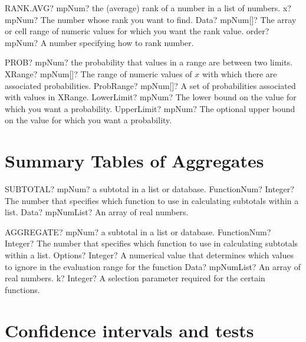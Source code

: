 \documentclass[12pt,a4paper,openany]{book}
\begin{document}
\begin{mpFunctionsExtract}
\mpWorksheetFunctionThreeNotImplemented
{RANK.AVG? mpNum? the (average) rank of a number in a list of numbers.}
{x? mpNum? The number whose rank you want to find.}
{Data? mpNum[]?  The array or cell range of numeric values for which you want the rank value.}
{order? mpNum? A number specifying how to rank number.}
\end{mpFunctionsExtract}

\begin{mpFunctionsExtract}
\mpWorksheetFunctionFourNotImplemented
{PROB? mpNum? the probability that values in a range are between two limits.}
{XRange? mpNum[]? The range of numeric values of $x$ with which there are associated probabilities.}
{ProbRange? mpNum[]?  A set of probabilities associated with values in \textsf{XRange}.}
{LowerLimit? mpNum? The lower bound on the value for which you want a probability.}
{UpperLimit? mpNum? The optional upper bound on the value for which you want a probability.}
\end{mpFunctionsExtract}

\section{Summary Tables of Aggregates}

\begin{mpFunctionsExtract}
\mpWorksheetFunctionTwoNotImplemented
{SUBTOTAL? mpNum? a subtotal in a list or database.}
{FunctionNum? Integer?  The number that specifies which function to use in calculating subtotals within a list.}
{Data? mpNumList? An array of real numbers.}
\end{mpFunctionsExtract}

\begin{mpFunctionsExtract}
\mpWorksheetFunctionFourNotImplemented
{AGGREGATE? mpNum? a subtotal in a list or database.}
{FunctionNum? Integer?  The number that specifies which function to use in calculating subtotals within a list.}
{Options? Integer?  A numerical value that determines which values to ignore in the evaluation range for the function}
{Data? mpNumList? An array of real numbers.}
{k? Integer?  A selection parameter required for the certain functions.}
\end{mpFunctionsExtract}

\section{Confidence intervals and tests}
\end{document}
